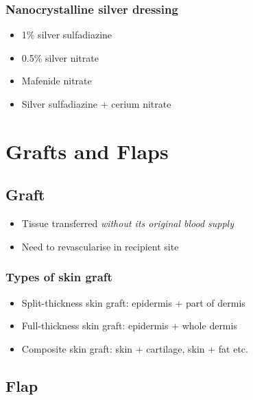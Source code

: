 \documentclass[
  14pt,
]{memoir}
\providecommand{\tightlist}{%
  \setlength{\itemsep}{0pt}\setlength{\parskip}{0pt}}
\begin{document}
\hypertarget{nanocrystalline-silver-dressing}{%
\subsection{Nanocrystalline silver
dressing}\label{nanocrystalline-silver-dressing}}

\begin{itemize}
\tightlist
\item
  1\% silver sulfadiazine
\item
  0.5\% silver nitrate
\item
  Mafenide nitrate
\item
  Silver sulfadiazine + cerium nitrate
\end{itemize}

\pagebreak

\hypertarget{grafts-and-flaps}{%
\chapter{Grafts and Flaps}\label{grafts-and-flaps}}

\hypertarget{graft}{%
\section{Graft}\label{graft}}

\begin{itemize}
\tightlist
\item
  Tissue transferred \emph{without its original blood supply}
\item
  Need to revascularise in recipient site
\end{itemize}

\hypertarget{types-of-skin-graft}{%
\subsection{Types of skin graft}\label{types-of-skin-graft}}

\begin{itemize}
\tightlist
\item
  Split-thickness skin graft: epidermis + part of dermis
\item
  Full-thickness skin graft: epidermis + whole dermis
\item
  Composite skin graft: skin + cartilage, skin + fat etc.
\end{itemize}

\hypertarget{flap}{%
\section{Flap}\label{flap}}
\end{document}

